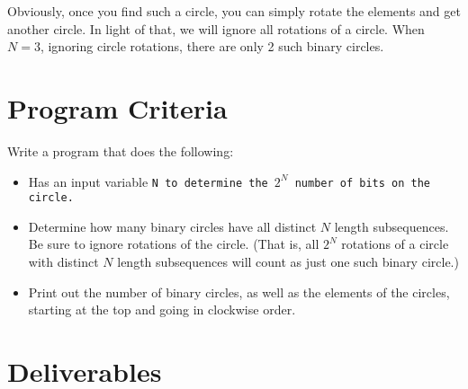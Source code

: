 \documentclass{article}
\def\prog#1{
\vspace{.1in}\begin{mdframed} \begin{center} \textbf{Programming Reminders} \end{center}#1 \end{mdframed} }
\begin{document}
	Obviously, once you find such a circle, you can simply rotate the elements and get another circle.  In light of that, we will ignore all rotations of a circle.  When  $N=3$, ignoring circle rotations, there are only 2 such binary circles.
	
	
 
 	
 	
 	
 	
 	
 	
 	

	
	
	
	
	
	
	
	




\section*{Program Criteria}
	Write a program that does the following:
	\begin{itemize}
		\item Has an input variable \tt{N} to determine the $2^N$ number of bits on the circle. 
		\item Determine how many binary circles have all distinct $N$ length subsequences.  Be sure to ignore rotations of the circle. (That is, all $2^N$ rotations of a circle with distinct $N$ length subsequences will count as just one such binary circle.)
		\item Print out the number of binary circles, as well as the elements of the circles, starting at the top and going in clockwise order.
	\end{itemize}







\section*{Deliverables}
	
\end{document}
